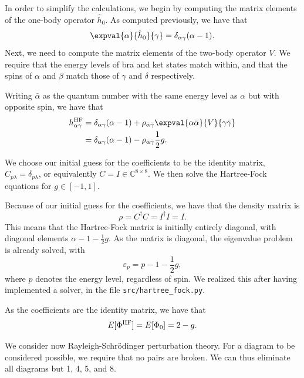 In order to simplify the calculations, we begin by computing the matrix elements of the one-body operator $\hat{h}_0$.
As computed previously, we have that
\begin{equation*}
    \expval{\alpha}{\hat{h}_0}{\gamma} = \delta_{\alpha\gamma} (\alpha - 1).
\end{equation*}
Next, we need to compute the matrix elements of the two-body operator $V$.
We require that the energy levels of bra and ket states match within, and that the spins of $\alpha$ and $\beta$ match those of $\gamma$ and $\delta$ respectively.

Writing $\bar{\alpha}$ as the quantum number with the same energy level as $\alpha$ but with opposite spin, we have that
\begin{align*}
    h_{\alpha\gamma}^\HF &= \delta_{\alpha\gamma} (\alpha - 1) + \rho_{\bar{\alpha}\bar{\gamma}} \expval{\alpha\bar{\alpha}}{V}{\gamma\bar{\gamma}} \\
    &= \delta_{\alpha\gamma} (\alpha - 1) - \rho_{\bar{\alpha}\bar{\gamma}} \frac{1}{2} g.
\end{align*}

We choose our initial guess for the coefficients to be the identity matrix, $C_{p\lambda} = \delta_{p\lambda}$, or equivalently $C = I \in \mathbb{C}^{8 \times 8}$.
We then solve the Hartree-Fock equations for $g \in [-1, 1]$.

Because of our initial guess for the coefficients, we have that the density matrix is
\begin{equation*}
    \rho = C^\dagger C = I^\dagger I = I.
\end{equation*}
This means that the Hartree-Fock matrix is initially entirely diagonal, with diagonal elements $\alpha - 1 - \frac{1}{2} g$.
As the matrix is diagonal, the eigenvalue problem is already solved, with
\begin{equation*}
    \varepsilon_p = p - 1 - \frac{1}{2} g,
\end{equation*}
where $p$ denotes the energy level, regardless of spin.
We realized this after having implemented a solver, in the file \verb|src/hartree_fock.py|.

As the coefficients are the identity matrix, we have that
\begin{equation*}
    E[\Phi^{\mathrm{HF}}] = E[\Phi_0] = 2 - g.
\end{equation*}

We consider now Rayleigh-Schr\"odinger perturbation theory.
For a diagram to be considered possible, we require that no pairs are broken.
We can thus eliminate all diagrams but 1, 4, 5, and 8. %

